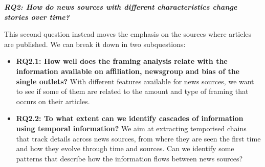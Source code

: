 \vspace{12px}

\textit{\textbf{RQ2: How do news sources with different characteristics change stories over time?}}

\vspace{12px}

This second question instead moves the emphasis on the sources where articles are published. We can break it down in two subquestions:

\begin{itemize}
    \item \textbf{RQ2.1: How well does the framing analysis relate with the information available on affiliation, newsgroup and bias of the single outlets?} With different features available for news sources, we want to see if some of them are related to the amount and type of framing that occurs on their articles.
    
    \item \textbf{RQ2.2: To what extent can we identify cascades of information using temporal information?} We aim at extracting temporised chains that track details across news sources, from where they are seen the first time and how they evolve through time and sources.
    Can we identify some patterns that describe how the information flows between news sources?
    
    
    
\end{itemize}
